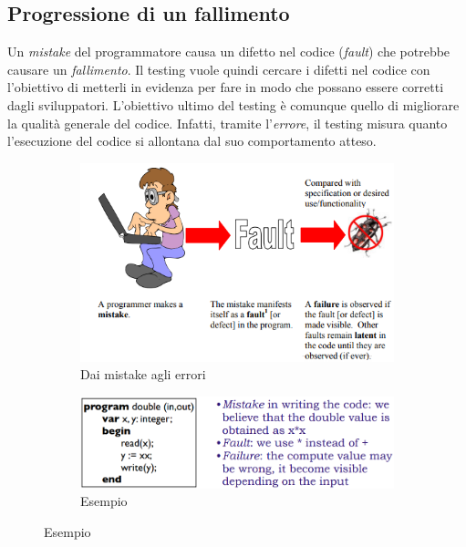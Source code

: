 \documentclass[a4paper,oneside,titlepage]{book}
\begin{document}
\subsection{Progressione di un fallimento}
Un \textit{mistake} del programmatore causa un difetto nel codice (\textit{fault}) che potrebbe causare un \textit{fallimento}. Il testing vuole quindi cercare i difetti nel codice con l'obiettivo di metterli in evidenza per fare in modo che possano essere corretti dagli sviluppatori. L'obiettivo ultimo del testing è comunque quello di migliorare la qualità generale del codice. Infatti, tramite l'\textit{errore}, il testing misura quanto l'esecuzione del codice si allontana dal suo comportamento atteso.
\begin{figure}[htp]
	\begin{subfigure}{0.49\textwidth}
	    \centering
		\includegraphics[width=\textwidth, height=\textheight, keepaspectratio]{testing1.png}
		\caption{Dai mistake agli errori}
	\end{subfigure}
	\hfill
	\begin{subfigure}{0.49\textwidth}
	    \centering
		\includegraphics[width=\textwidth, height=\textheight, keepaspectratio]{testing2.png} 
		\caption{Esempio}
	\end{subfigure}
\end{figure}
\end{document}

